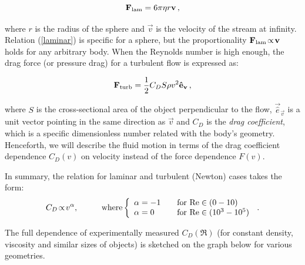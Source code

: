 \begin{equation}
\vec{F}_{\ind{lam}} = 6\pi \eta r \vec{v}\,,
\label{laminar}
\end{equation}

where $r$ is the radius of the sphere and $ \vec{v} $ is the velocity of the stream at infinity. Relation (\ref{laminar}) is specific for a sphere, but the proportionality $\vec{F}_{\ind{lam}}\!\propto\!\vec{v}$ holds for any arbitrary body.
When the Reynolds number is high enough, the drag force (or pressure drag) for a turbulent flow is expressed as:

\begin{equation}
\vec{F}_{\ind{turb}} = \frac{1}{2} C_D S \rho v^2 \vec{\hat{e}}_{\vec{v}}\,,
\label{turbulent}
\end{equation}

where $S$ is the cross-sectional area of the object perpendicular to the flow, $\vec{\hat{e}}_{\vec{v}}$ is a unit vector pointing in the same direction as $\vec{v}$ and $C_D$ is the \textit{drag coefficient}, which is a specific dimensionless number related with the body's geometry.
Henceforth, we will describe the fluid motion in terms of the drag coefficient dependence $C_D(v)$ on velocity instead of the force dependence $F(v)$.

In summary, the relation for laminar and turbulent (Newton) cases takes the form:
$$
C_D \!\propto\! v^\alpha, \hspace{1cm}
\text{where}
\left\{
  \begin{array}{l l}
    \alpha=-1 & \quad \text{for $\Re \in (0-10)$}\\
    \alpha=0 & \quad \text{for $\Re \in (10^3-10^5)$}
  \end{array}
\right.\,.
$$

The full dependence of experimentally measured $C_D(\Re)$ (for constant density, viscosity and similar sizes of objects) is sketched on the graph below for various geometries.

